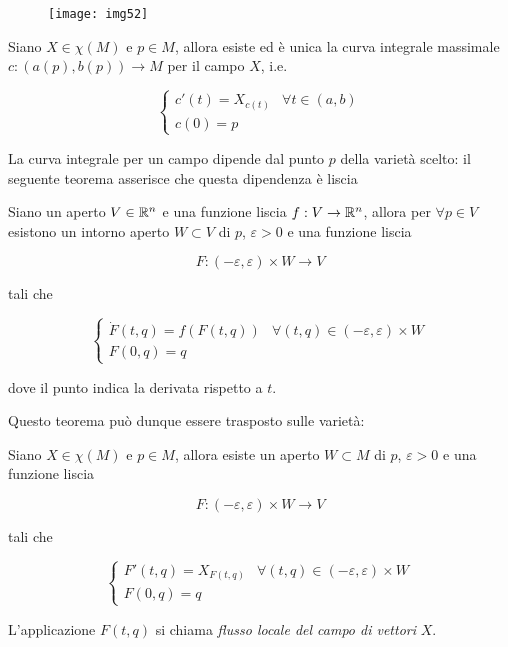 \begin{figure}[H]
	\centering
	\texttt{[image: img52]}
\end{figure}

\begin{theorem}
	Siano $ X \in \chi(M) $ e $ p \in M $, allora esiste ed è unica la curva integrale massimale $ c : (a(p),b(p)) \to M $ per il campo $ X $, i.e.
	
	\begin{equation}
		\begin{cases}
			c'(t) = X_{c(t)} & \forall t \in (a,b)\\
			c(0) = p
		\end{cases}
	\end{equation}
\end{theorem}

La curva integrale per un campo dipende dal punto $ p $ della varietà scelto: il seguente teorema asserisce che questa dipendenza è liscia

\begin{theorem}
	Siano un aperto $ V \in \mathbb{R}^{n} $ e una funzione liscia $ f : V \to \mathbb{R}^{n} $, allora per $ \forall p \in V $ esistono un intorno aperto $ W \subset V $ di $ p $, $ \varepsilon > 0 $ e una funzione liscia
	
	\begin{equation}
		F : (-\varepsilon,\varepsilon) \times W \to V
	\end{equation}

	tali che
	
	\begin{equation}
		\begin{cases}
			\dot{F}(t,q) = f(F(t,q)) & \forall (t,q) \in (-\varepsilon,\varepsilon) \times W\\
			F(0,q) = q
		\end{cases}
	\end{equation}

	dove il punto indica la derivata rispetto a $ t $.
\end{theorem}

Questo teorema può dunque essere trasposto sulle varietà:

\begin{theorem}\label{flux-var}
	Siano $ X \in \chi(M) $ e $ p \in M $, allora esiste un aperto $ W \subset M $ di $ p $, $ \varepsilon > 0 $ e una funzione liscia
	
	\begin{equation}
		F : (-\varepsilon,\varepsilon) \times W \to V
	\end{equation}

	tali che
	
	\begin{equation}
		\begin{cases}
			F'(t,q) = X_{F(t,q)} & \forall (t,q) \in (-\varepsilon,\varepsilon) \times W\\
			F(0,q) = q
		\end{cases}
	\end{equation}

	L'applicazione $ F(t,q) $ si chiama \textit{flusso locale del campo di vettori} $ X $.
\end{theorem}


